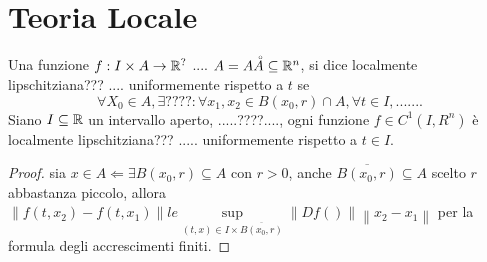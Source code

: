 \section{Teoria Locale}
 Una funzione $f:I\times A\to \mathbb{R}^{?}$ .... $A=A\accentset{\circ}{A}\subseteq \mathbb{R}^n$, si dice localmente lipschitziana??? .... uniformemente rispetto a $t$ se $$\forall X_0 \in A, \exists ???? : \forall x_1,x_2 \in B(x_0,r)\cap A, \forall t\in I, .......$$
\proposition
Siano $I\subseteq \mathbb{R}$ un intervallo aperto, .....????...., ogni funzione $f\in C^1(I,R^n)$ è localmente lipschitziana??? ..... uniformemente rispetto a $t\in I$.
\begin{proof}
	sia $x\in A \Leftarrow \exists B(x_0,r)\subseteq A$ con $r>0$, anche $\overline{B(x_0,r)}\subseteq A$ scelto $r$ abbastanza piccolo, allora $\left\| f(t,x_2)-f(t,x_1)\right\|le\sup\limits_{(t,x)\in I\times \overline{B(x_0,r)}}\left\| Df() \right\|\left\| x_2-x_1 \right\|  $ per la formula degli accrescimenti finiti.  
\end{proof}
